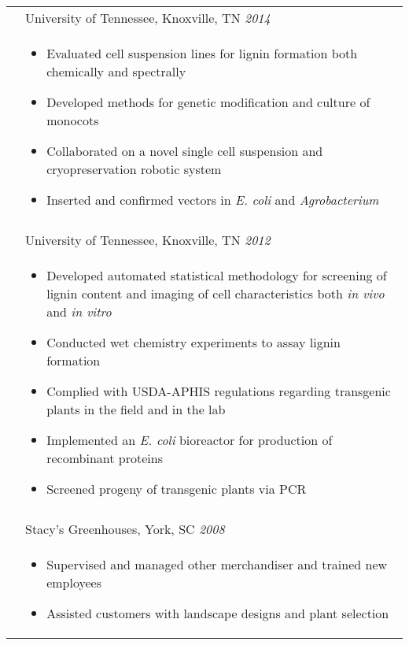 \documentclass[10pt]{article}
\begin{document}
\begin{minipage}[ht]{.75\linewidth}
\begin{tabularx}{\linewidth}{p{1.8cm}M}
       & University of Tennessee, Knoxville, TN \textit{2014 } \\
       & \begin{itemize}[topsep=-12pt,parsep=0em]
            \setlength\itemsep{0em}
            \item Evaluated cell suspension lines for lignin formation both chemically and spectrally
            \item Developed methods for genetic modification and culture of monocots
            \item Collaborated on a novel single cell suspension and cryopreservation robotic system
            \item {Inserted and confirmed vectors in \textit{E. coli} and \textit{Agrobacterium}}
         \end{itemize} \\
       &  \\
       & University of Tennessee, Knoxville, TN \textit{2012 } \\
       & \begin{itemize}[topsep=-12pt,parsep=0em]
            \setlength\itemsep{0em}
            \item Developed automated statistical methodology for screening of lignin content and imaging of cell characteristics both \textit{in vivo} and \textit{in vitro}
            \item Conducted wet chemistry experiments to assay lignin formation
            \item Complied with USDA-APHIS regulations regarding transgenic plants in the field and in the lab
            \item Implemented an \textit{E. coli} bioreactor for production of recombinant proteins
            \item Screened progeny of transgenic plants via PCR
         \end{itemize} \\
      &  \\
      & Stacy's Greenhouses, York, SC \textit{2008 } \\
      & \begin{itemize}[topsep=-12pt,parsep=0em]
           \setlength\itemsep{0em}
           \item Supervised and managed other merchandiser and trained new employees
           \item Assisted customers with landscape designs and plant selection

\end{itemize}
\end{tabularx}
\end{minipage}
\end{document}
